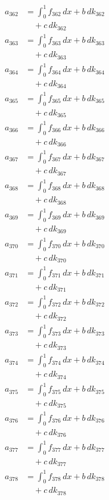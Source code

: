 \documentclass{article}
\begin{document}
\begin{align}
a_{362} &= \int_0^1 f_{362}\,dx + b\,dk_{362} \\
&\quad + c\,dk_{362} \\
a_{363} &= \int_0^1 f_{363}\,dx + b\,dk_{363} \\
&\quad + c\,dk_{363} \\
a_{364} &= \int_0^1 f_{364}\,dx + b\,dk_{364} \\
&\quad + c\,dk_{364} \\
a_{365} &= \int_0^1 f_{365}\,dx + b\,dk_{365} \\
&\quad + c\,dk_{365} \\
a_{366} &= \int_0^1 f_{366}\,dx + b\,dk_{366} \\
&\quad + c\,dk_{366} \\
a_{367} &= \int_0^1 f_{367}\,dx + b\,dk_{367} \\
&\quad + c\,dk_{367} \\
a_{368} &= \int_0^1 f_{368}\,dx + b\,dk_{368} \\
&\quad + c\,dk_{368} \\
a_{369} &= \int_0^1 f_{369}\,dx + b\,dk_{369} \\
&\quad + c\,dk_{369} \\
a_{370} &= \int_0^1 f_{370}\,dx + b\,dk_{370} \\
&\quad + c\,dk_{370} \\
a_{371} &= \int_0^1 f_{371}\,dx + b\,dk_{371} \\
&\quad + c\,dk_{371} \\
a_{372} &= \int_0^1 f_{372}\,dx + b\,dk_{372} \\
&\quad + c\,dk_{372} \\
a_{373} &= \int_0^1 f_{373}\,dx + b\,dk_{373} \\
&\quad + c\,dk_{373} \\
a_{374} &= \int_0^1 f_{374}\,dx + b\,dk_{374} \\
&\quad + c\,dk_{374} \\
a_{375} &= \int_0^1 f_{375}\,dx + b\,dk_{375} \\
&\quad + c\,dk_{375} \\
a_{376} &= \int_0^1 f_{376}\,dx + b\,dk_{376} \\
&\quad + c\,dk_{376} \\
a_{377} &= \int_0^1 f_{377}\,dx + b\,dk_{377} \\
&\quad + c\,dk_{377} \\
a_{378} &= \int_0^1 f_{378}\,dx + b\,dk_{378} \\
&\quad + c\,dk_{378} \\

\end{align}
\end{document}
